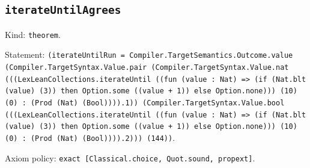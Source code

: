 \documentclass[11pt]{article}
\begin{document}
\subsection*{\texttt{iterateUntilAgrees}}
\noindent Kind: \texttt{theorem}.\par
\noindent Statement: \texttt{(iterateUntilRun = Compiler.TargetSemantics.Outcome.value (Compiler.TargetSyntax.Value.pair (Compiler.TargetSyntax.Value.nat (((LexLeanCollections.iterateUntil ((fun (value : Nat) => (if (Nat.blt (value) (3)) then Option.some ((value + 1)) else Option.none))) (10) (0) : (Prod (Nat) (Bool)))).1)) (Compiler.TargetSyntax.Value.bool (((LexLeanCollections.iterateUntil ((fun (value : Nat) => (if (Nat.blt (value) (3)) then Option.some ((value + 1)) else Option.none))) (10) (0) : (Prod (Nat) (Bool)))).2))) (144))}.\par
\noindent Axiom policy: \texttt{exact [Classical.choice, Quot.sound, propext]}.\par
\end{document}
